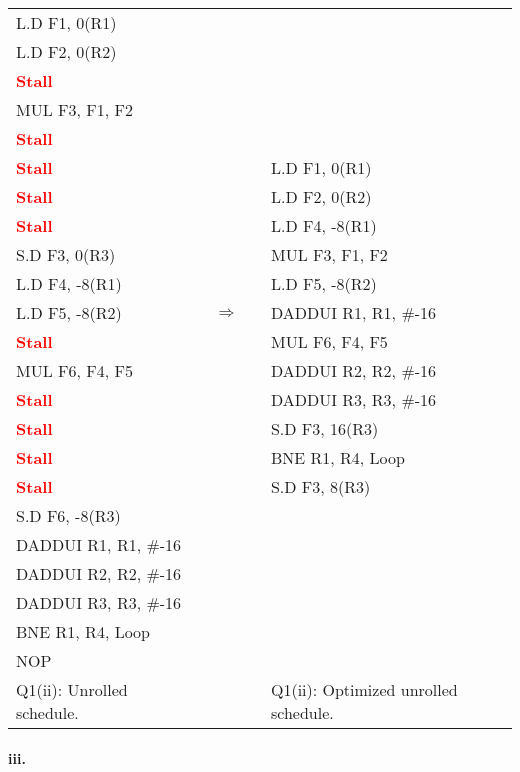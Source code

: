 \documentclass[11pt]{article}
\renewcommand{\part}[1]{\paragraph*{{#1}.}}
\newcommand{\code}[1]{\textsf{#1}}
\newcommand{\stall}{\textcolor{red}{\textbf{Stall}}}
\begin{document}
\begin{table}[h]
\begin{tabular}{lcccl}
	 \code{L.D F1, 0(R1)} & & & &  \\
	 \code{L.D F2, 0(R2)} & & & &  \\
	 \stall & & & &   \\
	 \code{MUL F3, F1, F2} & & & &  \\
	 \stall & & & &  \\
	 \stall & & & & \code{L.D F1, 0(R1)}  \\
	 \stall & & & &  \code{L.D F2, 0(R2)} \\
	 \stall & & & & \code{L.D F4, -8(R1)}  \\
	 \code{S.D F3, 0(R3)} & & & & \code{MUL F3, F1, F2}  \\
	 \code{L.D F4, -8(R1)} & & & &  \code{L.D F5, -8(R2)}  \\
	 \code{L.D F5, -8(R2)} & & $\Rightarrow$ & & \code{DADDUI R1, R1, \#-16} \\
	 \stall & & & &  \code{MUL F6, F4, F5} \\
	 \code{MUL F6, F4, F5} & & & & \code{DADDUI R2, R2, \#-16}  \\
	 \stall & & & &  \code{DADDUI R3, R3, \#-16} \\
	 \stall  & & & & \code{S.D F3, 16(R3)} \\
	 \stall & & & & \code{BNE R1, R4, Loop}  \\
	 \stall & & & & \code{S.D F3, 8(R3)}  \\	 
	 \code{S.D F6, -8(R3)} & & & &  \\
	 \code{DADDUI R1, R1, \#-16} & & & &  \\
	 \code{DADDUI R2, R2, \#-16} & & & &  \\
	 \code{DADDUI R3, R3, \#-16} & & & &  \\
	 \code{BNE R1, R4, Loop} & & & &  \\
	 \code{NOP} & & & & \\
	 Q1(ii): Unrolled schedule. & & & & Q1(ii): Optimized unrolled schedule.
\end{tabular}
\label{tbl:q1p2}
\end{table}


\part{iii} 
\end{document}
